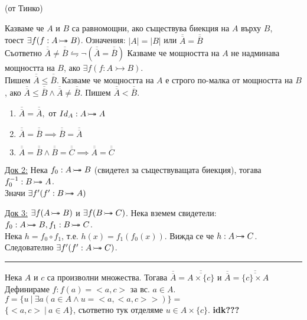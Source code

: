 \documentclass[fleqn, titlepage, 12pt]{report}
\newcommand*\rightbijectionarrow{\mathrel{\ooalign{
  $\twoheadrightarrow$\cr\hidewidth\hbox{$\rightarrowtail\mkern 1mu$}\cr }}}
\begin{document}
\begin{center}
(от Тинко)
\end{center}

\begin{center}
\end{center}
\bigbreak

 Казваме че $A$ и $B$ са равномощни, ако съществува биекция на $A$ върху $B$,\\
тоест $\exists{f}(f: A \rightbijectionarrow B)$.
Означения: $|A| = |B| $ или $ \overline{\overline{A}} = \overline{\overline{B}}$\\
Съответно $\overline{\overline{A}} \neq \overline{\overline{B}} \leftrightharpoons \lnot(\overline{\overline{A}} = \overline{\overline{B}})$
\bigbreak
Казваме че мощността на $A$ не надминава мощността на $B$, ако $\exists{f}(f: A \rightarrowtail B)$.\\
Пишем $\overline{\overline{A}} \leq \overline{\overline{B}}$.
\bigbreak
Казваме че мощността на $A$ е строго по-малка от мощността на $B$,
ако $\overline{\overline{A}} \leq \overline{\overline{B}} \land \overline{\overline{A}} \neq \overline{\overline{B}}$.
Пишем $\overline{\overline{A}} < \overline{\overline{B}}$.
\bigbreak

\begin{enumerate}
  \item $\overline{\overline{A}} = \overline{\overline{A}}, $ от $Id_A: A \rightbijectionarrow A$
  \item $\overline{\overline{A}} = \overline{\overline{B}} \implies \overline{\overline{B}} = \overline{\overline{A}}$
  \item $\overline{\overline{A}} = \overline{\overline{B}} \land \overline{\overline{B}} = \overline{\overline{C}}
    \implies \overline{\overline{A}} = \overline{\overline{C}}$
\end{enumerate}

\underline{Док 2:} Нека $f_0: A \rightbijectionarrow B$ (свидетел за съществуващата биекция),
тогава $f_0^{-1}: B \rightbijectionarrow A$.\\
Значи $\exists{f'}(f': B \rightbijectionarrow A)$
\bigbreak

\underline{Док 3:} $\exists{f}(A \rightbijectionarrow B)$ и $ \exists{f}(B \rightbijectionarrow C)$. Нека вземем
свидетели: $f_0: A \rightbijectionarrow B, f_1: B \rightbijectionarrow C$. \\
Нека $h = f_0 \circ f_1$, т.е. $h(x) = f_1(f_0(x))$. Вижда се че $h: A \rightbijectionarrow C$.
Следователно $\exists{f'}(f': A \rightbijectionarrow C)$.
\bigbreak
\hrule
\bigbreak
Нека $A$ и $c$ са произволни множества. Тогава $\overline{\overline{A}} = \overline{\overline{A \times \{ c \} }}$
и $\overline{\overline{A}} = \overline{\overline{\{ c \} \times  A}}$\\
Дефинираме $f: f(a) = <a,c>$ за вс. $a \in A$.
$f = \{u\ |\ \exists{a}(a \in A \land u = <a,<a,c>>)\} =$ \\
$\{<a,c>\ |\ a \in A\}$, съответно тук отделяме $u \in A \times \{ c \}$. \textbf{idk???}
\bigbreak
\end{document}
